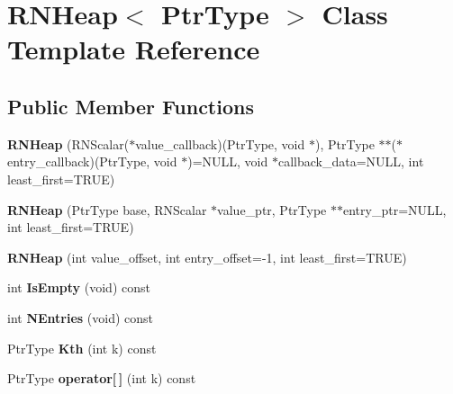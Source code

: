 \hypertarget{class_r_n_heap}{}\section{R\+N\+Heap$<$ Ptr\+Type $>$ Class Template Reference}
\label{class_r_n_heap}
\subsection*{Public Member Functions}
\begin{DoxyCompactItemize}
\item 
{\bfseries R\+N\+Heap} (R\+N\+Scalar($\ast$value\+\_\+callback)(Ptr\+Type, void $\ast$), Ptr\+Type $\ast$$\ast$($\ast$entry\+\_\+callback)(Ptr\+Type, void $\ast$)=N\+U\+LL, void $\ast$callback\+\_\+data=N\+U\+LL, int least\+\_\+first=T\+R\+UE)\hypertarget{class_r_n_heap_a7953360d80b5b3bf1ebd4cc8c60e8c3f}{}\label{class_r_n_heap_a7953360d80b5b3bf1ebd4cc8c60e8c3f}

\item 
{\bfseries R\+N\+Heap} (Ptr\+Type base, R\+N\+Scalar $\ast$value\+\_\+ptr, Ptr\+Type $\ast$$\ast$entry\+\_\+ptr=N\+U\+LL, int least\+\_\+first=T\+R\+UE)\hypertarget{class_r_n_heap_a88f3a8ac5140207edc206d6615cdc786}{}\label{class_r_n_heap_a88f3a8ac5140207edc206d6615cdc786}

\item 
{\bfseries R\+N\+Heap} (int value\+\_\+offset, int entry\+\_\+offset=-\/1, int least\+\_\+first=T\+R\+UE)\hypertarget{class_r_n_heap_a42aab1d9286caa049676731ff2da753f}{}\label{class_r_n_heap_a42aab1d9286caa049676731ff2da753f}

\item 
int {\bfseries Is\+Empty} (void) const \hypertarget{class_r_n_heap_a65d214a5932cf5ce73c2d573b2cbbb34}{}\label{class_r_n_heap_a65d214a5932cf5ce73c2d573b2cbbb34}

\item 
int {\bfseries N\+Entries} (void) const \hypertarget{class_r_n_heap_ab67a0da0ff305167165706594534a685}{}\label{class_r_n_heap_ab67a0da0ff305167165706594534a685}

\item 
Ptr\+Type {\bfseries Kth} (int k) const \hypertarget{class_r_n_heap_a9ed01ddc045b21264e549f1aae958b0b}{}\label{class_r_n_heap_a9ed01ddc045b21264e549f1aae958b0b}

\item 
Ptr\+Type {\bfseries operator\mbox{[}$\,$\mbox{]}} (int k) const \hypertarget{class_r_n_heap_a988177bcfd495e2a6ed5bee0b50b2d26}{}\label{class_r_n_heap_a988177bcfd495e2a6ed5bee0b50b2d26}


\end{DoxyCompactItemize}
